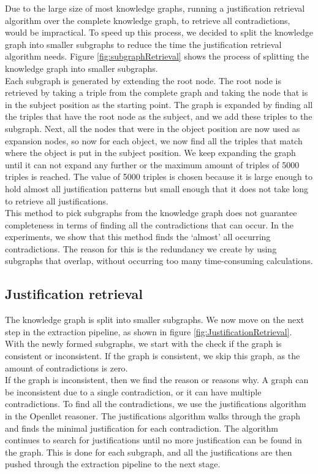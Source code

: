 \documentclass[11pt,letterpaper ,oneside ]{book}
\begin{document}
	Due to the large size of most knowledge graphs, running a justification retrieval algorithm over the complete knowledge graph, to retrieve all contradictions, would be impractical. To speed up this process, we decided to split the knowledge graph into smaller subgraphs to reduce the time the justification retrieval algorithm needs. Figure \ref{fig:subgraphRetrieval} shows the process of splitting the knowledge graph into smaller subgraphs.\\
	Each subgraph is generated by extending the root node. The root node is retrieved by taking a triple from the complete graph and taking the node that is in the subject position as the starting point. The graph is expanded by finding all the triples that have the root node as the subject, and we add these triples to the subgraph. Next, all the nodes that were in the object position are now used as expansion nodes, so now for each object, we now find all the triples that match where the object is put in the subject position. We keep expanding the graph until it can not expand any further or the maximum amount of triples of 5000 triples is reached. The value of 5000 triples is chosen because it is large enough to hold almost all justification patterns but small enough that it does not take long to retrieve all justifications.\\
	This method to pick subgraphs from the knowledge graph does not guarantee completeness in terms of finding all the contradictions that can occur. In the experiments, we show that this method finds the `almost' all occurring contradictions. The reason for this is the redundancy we create by using subgraphs that overlap, without occurring too many time-consuming calculations. 
	
	\subsection{Justification retrieval}
	The knowledge graph is split into smaller subgraphs. We now move on the next step in the extraction pipeline, as shown in figure \ref{fig:JustificationRetrieval}.
	With the newly formed subgraphs, we start with the check if the graph is consistent or inconsistent. If the graph is consistent, we skip this graph, as the amount of contradictions is zero.\\ 
	If the graph is inconsistent, then we find the reason or reasons why. A graph can be inconsistent due to a single contradiction, or it can have multiple contradictions. 
	To find all the contradictions, we use the justifications algorithm in the Openllet reasoner. The justifications algorithm walks through the graph and finds the minimal justification for each contradiction. The algorithm continues to search for justifications until no more justification can be found in the graph. This is done for each subgraph, and all the justifications are then pushed through the extraction pipeline to the next stage.\\
	
\end{document}
